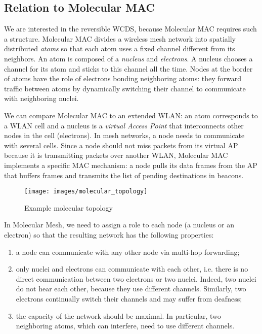 \documentclass[twoside]{article}
\begin{document}
\subsection{Relation to Molecular MAC}

We are interested in the reversible WCDS, because Molecular MAC
\cite{molecular09rr} requires such a structure.  Molecular MAC divides
a wireless mesh network into spatially distributed \emph{atoms} so that each
atom uses a fixed channel different from its neighbors. An atom is
composed of a \emph{nucleus} and \emph{electrons}. A nucleus chooses a
channel for its atom and sticks to this channel all the time.  Nodes
at the border of atoms have the role of electrons bonding neighboring
atoms: they forward traffic between atoms by dynamically switching
their channel to communicate with neighboring nuclei.

We can compare Molecular MAC to an extended WLAN: an atom corresponds
to a WLAN cell and a nucleus is a \emph{virtual Access Point} that
interconnects other nodes in the cell (electrons). In mesh
networks, a node needs to communicate with several
cells. Since a node should not miss packets from its virtual AP because it is transmitting packets over another WLAN, Molecular MAC
implements a specific MAC mechanism: a node pulls its data frames
from the AP that buffers frames and transmits the list of pending
destinations in beacons.



\begin{figure}
\begin{center}
	\texttt{[image: images/molecular\_topology]}
	\caption{Example molecular topology}
	\label{fig:molecular_topology}
\end{center}
\end{figure}

In Molecular Mesh, we need to assign a role to each node (a nucleus or
an electron) so that the resulting network has the following
properties:
\begin{enumerate}
	\item a node can communicate with any other node via multi-hop forwarding;
	\item only nuclei and electrons can communicate with each
          other, i.e. there is no direct communication between two electrons
          or two nuclei. Indeed, two nuclei do not hear each other,
          because they use different channels. Similarly, two
          electrons continually switch their channels and may suffer
          from deafness;
	\item the capacity of the network should be maximal. In particular, two neighboring atoms, which can interfere, need to use different channels.
\end{enumerate}
\end{document}
